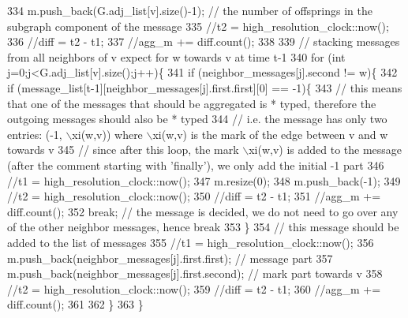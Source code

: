 \begin{DoxyCode}
334 \textcolor{comment}{          m.push\_back(G.adj\_list[v].size()-1); // the number of offsprings in the subgraph component of the
       message}
335 \textcolor{comment}{          //t2 = high\_resolution\_clock::now();}
336 \textcolor{comment}{          //diff = t2 - t1;}
337 \textcolor{comment}{          //agg\_m += diff.count();}
338 \textcolor{comment}{}
339 \textcolor{comment}{          // stacking messages from all neighbors of v expect for w towards v at time t-1}
340 \textcolor{comment}{          for (int j=0;j<G.adj\_list[v].size();j++)\{}
341 \textcolor{comment}{            if (neighbor\_messages[j].second != w)\{}
342 \textcolor{comment}{              if (message\_list[t-1][neighbor\_messages[j].first.first][0] == -1)\{}
343 \textcolor{comment}{                // this means that one of the messages that should be aggregated is * typed, therefore the
       outgoing messages should also be * typed}
344 \textcolor{comment}{                // i.e. the message has only two entries: (-1, \(\backslash\)xi(w,v)) where \(\backslash\)xi(w,v) is the mark of the
       edge between v and w towards v}
345 \textcolor{comment}{                // since after this loop, the mark \(\backslash\)xi(w,v) is added to the message (after the comment
       starting with 'finally'), we only add the initial -1 part}
346 \textcolor{comment}{                //t1 = high\_resolution\_clock::now();}
347 \textcolor{comment}{                m.resize(0);}
348 \textcolor{comment}{                m.push\_back(-1);}
349 \textcolor{comment}{                //t2 = high\_resolution\_clock::now();}
350 \textcolor{comment}{                //diff = t2 - t1;}
351 \textcolor{comment}{                //agg\_m += diff.count();}
352 \textcolor{comment}{                break; // the message is decided, we do not need to go over any of the other neighbor
       messages, hence break}
353 \textcolor{comment}{              \}}
354 \textcolor{comment}{              // this message should be added to the list of messages}
355 \textcolor{comment}{              //t1 = high\_resolution\_clock::now();}
356 \textcolor{comment}{              m.push\_back(neighbor\_messages[j].first.first); // message part}
357 \textcolor{comment}{              m.push\_back(neighbor\_messages[j].first.second); // mark part towards v}
358 \textcolor{comment}{              //t2 = high\_resolution\_clock::now();}
359 \textcolor{comment}{              //diff = t2 - t1;}
360 \textcolor{comment}{              //agg\_m += diff.count();}
361 \textcolor{comment}{}
362 \textcolor{comment}{            \}}
363 \textcolor{comment}{          \}}

\end{DoxyCode}
